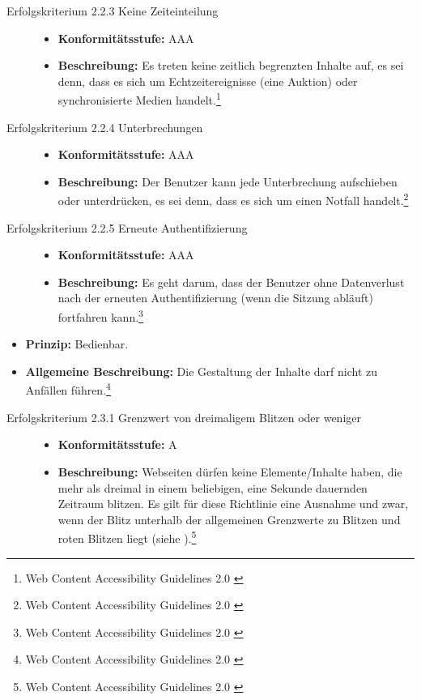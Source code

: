 \begin{description}
\begin{description}
		\item[Erfolgskriterium 2.2.3 Keine Zeiteinteilung]\hfill
		\begin{itemize}
			\item \textbf{Konformitätsstufe:} AAA
			\item \textbf{Beschreibung:} Es treten keine zeitlich begrenzten Inhalte auf, es sei denn, dass es sich um Echtzeitereignisse (eine Auktion) oder  
			synchronisierte Medien handelt.\footnote{Web Content Accessibility Guidelines 2.0 \cite{WCAG2.0}}
		\end{itemize}
		
		\item[Erfolgskriterium 2.2.4 Unterbrechungen]\hfill
		\begin{itemize}
			\item \textbf{Konformitätsstufe:} AAA
			\item \textbf{Beschreibung:} Der Benutzer kann jede Unterbrechung aufschieben oder unterdrücken, es sei denn, dass es sich um einen Notfall 
			handelt.\footnote{Web Content Accessibility Guidelines 2.0 \cite{WCAG2.0}}
		\end{itemize}
		
		\item[Erfolgskriterium 2.2.5 Erneute Authentifizierung]\hfill
		\begin{itemize}
			\item \textbf{Konformitätsstufe:} AAA
			\item \textbf{Beschreibung:} Es geht darum, dass der Benutzer ohne Datenverlust nach der erneuten Authentifizierung (wenn die Sitzung abläuft) 
			fortfahren kann.\footnote{Web Content Accessibility Guidelines 2.0 \cite{WCAG2.0}}
		\end{itemize}
	\end{description}
	
	\item [Richtlinie 2.3 Anfälle]\hfill
	\begin{itemize}
		\item \textbf{Prinzip:} Bedienbar.
		\item \textbf{Allgemeine Beschreibung:} Die Gestaltung der Inhalte darf nicht zu Anfällen führen.\footnote{Web Content Accessibility Guidelines 2.0 \cite{WCAG2.0}}
	\end{itemize}
	
	\begin{description}
		\item[Erfolgskriterium 2.3.1 Grenzwert von dreimaligem Blitzen oder weniger]\hfill
		\begin{itemize}
			\item \textbf{Konformitätsstufe:} A
			\item \textbf{Beschreibung:} Webseiten dürfen keine Elemente/Inhalte haben, die mehr als dreimal in einem beliebigen, eine Sekunde dauernden Zeitraum 
			blitzen. Es gilt für diese Richtlinie eine Ausnahme und zwar, wenn der Blitz unterhalb der allgemeinen Grenzwerte zu Blitzen und roten Blitzen liegt
			(siehe ).\footnote{Web Content Accessibility Guidelines 2.0 \cite{WCAG2.0}}
		\end{itemize}
		

\end{description}
\end{description}
